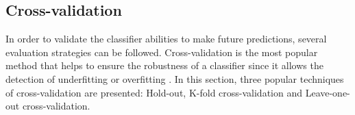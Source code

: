 \documentclass[a4paper,10pt]{article}
\begin{document}
%
%
%
%

\subsection{Cross-validation}

In order to validate the classifier abilities to make future predictions,
several evaluation strategies can be followed. Cross-validation is the most popular method that helps to ensure the robustness of a classifier  since it allows the detection of underfitting or overfitting \cite{dangeti2017statistics}.
In this section, three popular techniques of cross-validation are presented: Hold-out, K-fold cross-validation and Leave-one-out cross-validation.
\end{document}
